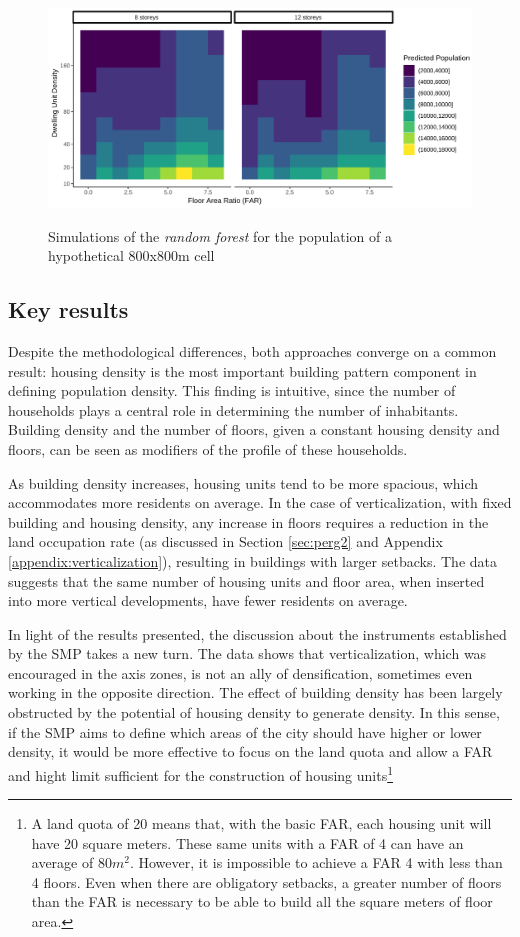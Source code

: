 \begin{figure}[h]
    \centering
    \caption{Simulations of the \textit{random forest} for the population of a hypothetical 800x800m cell}
    \includegraphics[width = \textwidth]{figuras/previsoes.pdf}
    \label{fig:previsoes}
\end{figure}

\subsection{Key results}

Despite the methodological differences, both approaches converge on a common result: housing density is the most important building pattern component in defining population density. This finding is intuitive, since the number of households plays a central role in determining the number of inhabitants. Building density and the number of floors, given a constant housing density and floors, can be seen as modifiers of the profile of these households.

As building density increases, housing units tend to be more spacious, which accommodates more residents on average. In the case of verticalization, with fixed building and housing density, any increase in floors requires a reduction in the land occupation rate (as discussed in Section \ref{sec:perg2} and Appendix \ref{appendix:verticalization}), resulting in buildings with larger setbacks. The data suggests that the same number of housing units and floor area, when inserted into more vertical developments, have fewer residents on average.

In light of the results presented, the discussion about the instruments established by the SMP takes a new turn. The data shows that verticalization, which was encouraged in the axis zones, is not an ally of densification, sometimes even working in the opposite direction. The effect of building density has been largely obstructed by the potential of housing density to generate density. In this sense, if the SMP aims to define which areas of the city should have higher or lower density, it would be more effective to focus on the land quota and allow a FAR and hight limit sufficient for the construction of housing units\footnote{A land quota of 20 means that, with the basic FAR, each housing unit will have 20 square meters. These same units with a FAR of 4 can have an average of 80$m^2$. However, it is impossible to achieve a FAR 4 with less than 4 floors. Even when there are obligatory setbacks, a greater number of floors than the FAR is necessary to be able to build all the square meters of floor area.}

